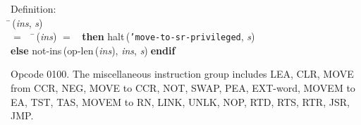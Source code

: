 \begin{tabbing}{\sc Definition}: \\  
\=\,({\it{ins\/}}, {\it{s\/}}) \\ 
$=$$\;\;\;\;$\=\,({\it{ins\/}}) $=$ {}$\;\;${\bf then }{\rm{halt}}\,({\tt{'}}{\tt{move-to-sr-privileged}}, {\it{s\/}}) \\ 
{\bf else }{\rm{not-ins}}\,({\rm{op-len}}\,({\it{ins\/}}), {\it{ins\/}}, {\it{s\/}})$\;${\bf  endif}\-\-
\end{tabbing}

 Opcode 0100.
 The miscellaneous instruction group includes LEA, CLR, MOVE from CCR,
 NEG, MOVE to CCR, NOT, SWAP, PEA, EXT-word, MOVEM to EA, TST, TAS,
 MOVEM to RN, LINK, UNLK, NOP, RTD, RTS, RTR, JSR, JMP.
